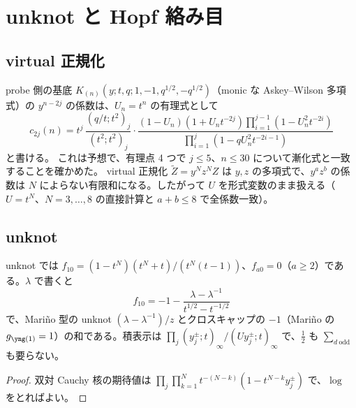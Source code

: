 \section{unknot と Hopf 絡み目}\label{sec:hopf}

\subsection{virtual 正規化}
probe 側の基底 $K_{(n)}(y; t, q; 1, -1, q^{1/2}, -q^{1/2})$（monic な Askey--Wilson 多項式）の $y^{n-2j}$ の係数は、$U_n = t^n$ の有理式として
\[
c_{2j}(n) = t^j\, \frac{(q/t; t^2)_j}{(t^2; t^2)_j}\cdot\frac{(1 - U_n)(1 + U_n t^{-2j})\prod_{i=1}^{j-1}(1 - U_n^2 t^{-2i})}{\prod_{i=1}^{j}(1 - qU_n^2 t^{-2i-1})}
\]
と書ける。
これは予想で、有理点 4 つで $j \le 5$、$n \le 30$ について漸化式と一致することを確かめた。
virtual 正規化 $\tilde Z = y^N z^N Z$ は $y, z$ の多項式で、$y^a z^b$ の係数は $N$ によらない有限和になる。したがって $U$ を形式変数のまま扱える（$U = t^N$、$N = 3, \dots, 8$ の直接計算と $a + b \le 8$ で全係数一致）。

\subsection{unknot}
\begin{proposition}
unknot では $f_{10} = (1 - t^N)(t^N + t)/(t^N(t-1))$、$f_{a0} = 0$（$a \ge 2$）である。$\lambda$ で書くと
\[
f_{10} = -1 - \frac{\lambda - \lambda^{-1}}{t^{1/2} - t^{-1/2}}
\]
で、Mariño 型の unknot $(\lambda - \lambda^{-1})/z$ とクロスキャップの $-1$（Mariño の $g_{\yone} = 1$）の和である。積表示は $\prod_j (y_j^{\pm}; t)_\infty / (U y_j^{\pm}; t)_\infty$ で、$\tfrac12$ も $\sum_{d\ \mathrm{odd}}$ も要らない。
\end{proposition}
\begin{proof}
双対 Cauchy 核の期待値は $\prod_j\prod_{k=1}^{N} t^{-(N-k)}(1 - t^{N-k}y_j^{\pm})$ で、$\log$ をとればよい。
\end{proof}

